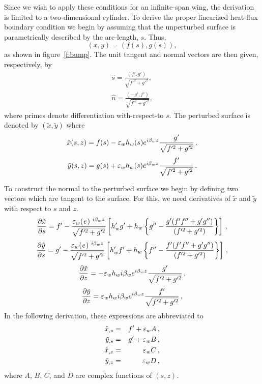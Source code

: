 Since we wish to apply these conditions for an infinite-span wing, the
derivation is limited to a two-dimensional cylinder.  To derive the proper
linearized heat-flux boundary condition we begin by assuming that the
unperturbed surface is parametrically described by the arc-length, $s$.  Thus,
%
\begin{equation}
  (x, y) = ( f(s), g(s) ),
\end{equation}
%
as shown in figure~\ref{f:bump}.  The unit tangent and normal vectors are then
given, respectively, by
%
\begin{eqnarray}
  \hat s = \frac{(f',g')}{\sqrt{f'^2 + g'^2}}  \comma \\
  \hat n = \frac{(-g',f')}{\sqrt{f'^2 + g'^2}} \comma
\end{eqnarray}
%
where primes denote differentiation with-respect-to $s$.  The perturbed
surface is denoted by $(\tilde x, \tilde y)$ where
%
\begin{equation}
  \tilde x(s,z) = f(s) - {\varepsilon_w} h_w(s) e^{i {\beta_{w}} z} 
                         \frac{g'}{\sqrt{f'^2 +g'^2}} {\, ,}
\end{equation}
%
\begin{equation}
  \tilde y(s,z) = g(s) + {\varepsilon_w} h_w(s) e^{i {\beta_{w}} z} 
                         \frac{f'}{\sqrt{f'^2 +g'^2}} {\, .}
\end{equation}

To construct the normal to the perturbed surface we begin by defining two
vectors which are tangent to the surface.  For this, we need derivatives of
$\tilde x$ and $\tilde y$ with respect to $s$ and $z$.
%
\begin{equation}
  \frac{\partial \tilde x}{\partial s} = f' - \frac{\ew \e^{i\bw z}}
  {\sqrt{f'^2 +g'^2}} \left[ h'_w g' + h_w \left\{ g'' - 
  \frac{g'(f'f'' + g'g'')}{(f'^2 +g'^2)} \right\} \right] \comma
\end{equation}
%
\begin{equation}
  \frac{\partial \tilde y}{\partial s} = g' - \frac{\ew \e^{i\bw z}}
  {\sqrt{f'^2 +g'^2}} \left[ h'_w f' + h_w \left\{ f'' - 
  \frac{f'(f'f'' + g'g'')}{(f'^2 +g'^2)} \right\} \right] \comma
\end{equation}
%
\begin{equation}
  \frac{\partial \tilde x}{\partial z} = -{\varepsilon_w} h_w i 
  {\beta_{w}} e^{i {\beta_{w}} z} \frac{g'}{\sqrt{f'^2 +g'^2}} {\, ,}
\end{equation}
%
\begin{equation}
  \frac{\partial \tilde y}{\partial z} = {\varepsilon_w} h_w i 
  {\beta_{w}} e^{i {\beta_{w}} z} \frac{f'}{\sqrt{f'^2 +g'^2}} {\, ,}
\end{equation}
%
In the following derivation, these expressions are abbreviated to
%
\begin{eqnarray}
  \tilde x_{,s} &=& f' + {\varepsilon_w} A {\, ,} \label{e:shortxs} \\
  \tilde y_{,s} &=& g' + {\varepsilon_w} B {\, ,} \label{e:shortys} \\
  \tilde x_{,z} &=& {\varepsilon_w} C      {\, ,} \label{e:shortxz} \\
  \tilde y_{,z} &=& {\varepsilon_w} D      {\, ,} \label{e:shortyz}
\end{eqnarray}
%
where $A$, $B$, $C$, and $D$ are complex functions of $(s,z)$.


